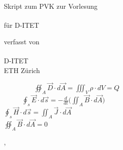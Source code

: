 

\thispagestyle{empty}  %
\large  %

\begin{center}

\vfill


Skript zum PVK zur Vorlesung\\[10mm]

{\LARGE\bfseries\mytitle} \\
\vspace{1cm}
für D-ITET
\vfill


verfasst von \\[5mm]
{\large\bfseries\myauthor}\\[5mm]
D-ITET\\
ETH Zürich \\
\vspace{4cm}
\end{center}
\begin{tcolorbox}
  \begin{center}
$ \displaystyle \ \  \ \ \  \ \  \ \ \ \ \  \ \ \ \ \  \ \ \ \oiint_A \vec{D} \cdot d \vec{A} = \iiint_V \rho \cdot dV = Q \  \ \ \ \  \ \ \ \ \ \ \ \ $ \\

$ \displaystyle  \ \ \ \  \ \ \ \   \ \ \ \ \oint_s \vec{E} \cdot d \vec{s} = - \frac{d}{dt} \bigg( \iint_A \vec{B} \cdot d \vec{A}  \bigg)$\\


$ \displaystyle \oint_s \vec{H} \cdot d \vec{s} = \iint_A \vec{J} \cdot d\vec{A}   \ \ \ \  $\\
$ \displaystyle \oiint_A \vec{B} \cdot d \vec{A} = 0 \     \   \ \ \ \  \ \ \ \   \ \ \ \  $\\
\end{center}
\end{tcolorbox}
\begin{center}
\vfill

\mysubmissiontown, \mysubmissionmonth~\mysubmissionyear

\end{center}
\normalsize %

\newpage


